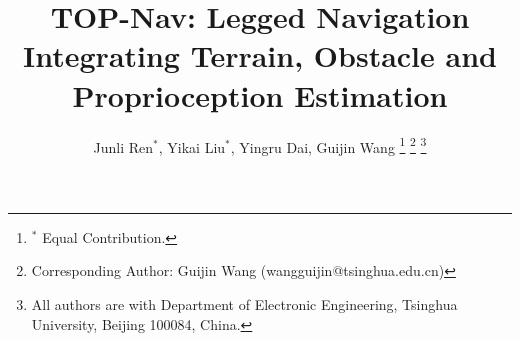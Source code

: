 \documentclass[conference]{IEEEtran}
\begin{document}
\newcommand{\Red}[1]{\textcolor[rgb]{1.00,0.00,0.00}{#1}}
\newcommand{\setParDis}{\setlength{\parskip}{0.2cm}}
\newcommand{\commentdyr}[1]{\Red{#1}}
\title{TOP-Nav: Legged Navigation Integrating Terrain, Obstacle and Proprioception Estimation}

\author{Junli Ren$^*$, Yikai Liu$^*$, Yingru Dai, Guijin Wang
\thanks{
$^*$ Equal Contribution.}
\thanks{
Corresponding Author: Guijin Wang (wangguijin@tsinghua.edu.cn)}
\thanks{
All authors are with Department of Electronic Engineering, Tsinghua University, Beijing 100084, China.}}





% 
\end{document}
